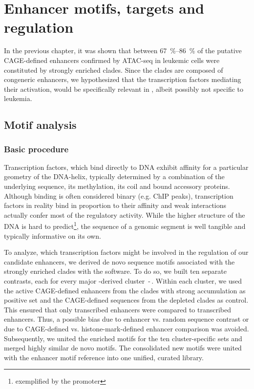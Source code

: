 \chapter{Enhancer motifs, targets and regulation} 
\label{chap:r:enhancers:motifs}
\vspace{-3.5em}
\minitoc

In the previous chapter, it was shown that between \SIrange{67}{86}{\percent} of the putative CAGE-defined enhancers confirmed by ATAC-seq in \mllafnine leukemic cells were constituted by strongly enriched clades. Since the clades are composed of congeneric enhancers, we hypothesized that the transcription factors mediating their activation, would be specifically relevant in \mllafnine, albeit possibly not specific to leukemia. 

\section{Motif analysis}
\label{chap:r:enhancers:motifs:tfs}
\subsection{Basic procedure}
\label{chap:r:enhancers:motifs:tfs:basic} 

Transcription factors, which bind directly to DNA exhibit affinity for a particular geometry of the DNA-helix, typically determined by a combination of the underlying sequence, its methylation, its coil and bound accessory proteins\cite{Belmont2001,Harteis2014}. Although binding is often considered binary (e.g. ChIP peaks), transcription factors in reality bind in proportion to their affinity and weak interactions actually confer most of the regulatory activity\cite{DeBoer2019}. While the higher structure of the DNA is hard to predict\footnote{exemplified by the \kit promoter\cite{Phan2007}}\cite{SantaLucia2004}, the sequence of a genomic segment is well tangible and typically informative on its own.  

To analyze, which transcription factors might be involved in the regulation of our candidate enhancers, we derived de novo sequence motifs associated with the strongly enriched clades with the  software. To do so, we built ten separate contrasts, each for every major \hisfourone-derived cluster \,-\,. Within each cluster, we used the active CAGE-defined enhancers from the clades with strong accumulation as positive set and the CAGE-defined sequences from the depleted clades as control. This ensured that only transcribed enhancers were compared to transcribed enhancers. Thus, a possible bias due to enhancer vs. random sequence contrast or due to CAGE-defined vs. histone-mark-defined enhancer comparison was avoided. Subsequently, we united the enriched motifs for the ten cluster-specific sets and merged highly similar de novo motifs. The consolidated new motifs were united with the  enhancer motif reference into one unified, curated library.

